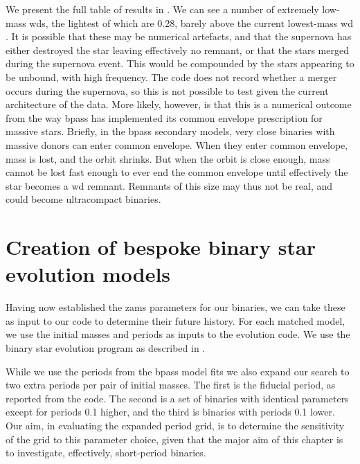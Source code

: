 We present the full table of results in . We can see a number of extremely low-mass \glspl{wd}, the lightest of which are \SI{0.28}{\msun}, barely above the current lowest-mass \gls{wd} \citep[\SI{0.17}{\msun};][]{Kilic:2007}. It is possible that these may be numerical artefacts, and that the supernova has either destroyed the star leaving effectively no remnant, or that the stars merged during the supernova event. This would be compounded by the stars appearing to be unbound, with high frequency. The  code does not record whether a merger occurs during the supernova, so this is not possible to test given the current architecture of the data. More likely, however, is that this is a numerical outcome from the way \gls{bpass} has implemented its common envelope prescription for massive stars. Briefly, in the \gls{bpass} secondary models, very close binaries with massive donors can enter common envelope. When they enter common envelope, mass is lost, and the orbit shrinks. But when the orbit is close enough, mass cannot be lost fast enough to ever end the common envelope until effectively the star becomes a \gls{wd} remnant. Remnants of this size may thus not be real, and could become ultracompact binaries.

\section{Creation of bespoke binary star evolution models}\label{sec:forward_evolution}

Having now established the \gls{zams} parameters for our binaries, we can take these as input to our  code to determine their future history. For each matched model, we use the initial masses and periods as inputs to the  evolution code. We use the  binary star evolution program as described in .

While we use the periods from the \gls{bpass} model fits we also expand our search to two extra periods per pair of initial masses. The first is the fiducial period, as reported from the  code. The second is a set of binaries with identical parameters except for periods \SI{0.1}{\dex} higher, and the third is binaries with periods \SI{0.1}{\dex} lower. Our aim, in evaluating the expanded period grid, is to determine the sensitivity of the grid to this parameter choice, given that the major aim of this chapter is to investigate, effectively, short-period binaries.

